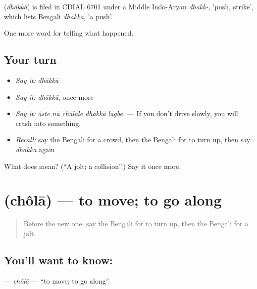\begin{cousinweb}
\textbf{} (\emph{dhākkā}) is filed in CDIAL 6701 under a Middle Indo-Aryan \emph{dhakk-}, 'push, strike', which lists Bengali \emph{dhākkā}, 'a push'.
\end{cousinweb}

\begin{grammarlens}[title={What you've built}]
One more word for telling what happened.
\end{grammarlens}

\subsection*{Your turn}
\begin{itemize}
\raggedright
  \item \emph{Say it:} \emph{dhākkā}
  \item \emph{Say it:} \emph{dhākkā}, once more
  \item \emph{Say it:} \emph{āste nā chālāle dhākkā lāgbe.} — If you don't drive slowly, you will crash into something.
  \item \emph{Recall:} say the Bengali for a crowd, then the Bengali for to turn up, then say \emph{dhākkā} again
\end{itemize}

\begin{tcolorbox}[breakable,colback=teal!4,colframe=teal!35!black,title={Before you move on}]
What does  mean? (\textquotedblleft{}A jolt; a collision\textquotedblright{}.) Say it once more.
\end{tcolorbox}
\section[\texorpdfstring{\bn{চলা} (chôlā)}{চলা (chôlā)}]{ (chôlā) — to move; to go along}

\label{lesson:BN-C278-chola}



\begin{quote}
Before the new one: say the Bengali for to turn up, then the Bengali for a jolt.
\end{quote}

\subsection*{You'll want to know: }
\textbf{} — \emph{chôlā} — \textquotedblleft{}to move; to go along\textquotedblright{}.

